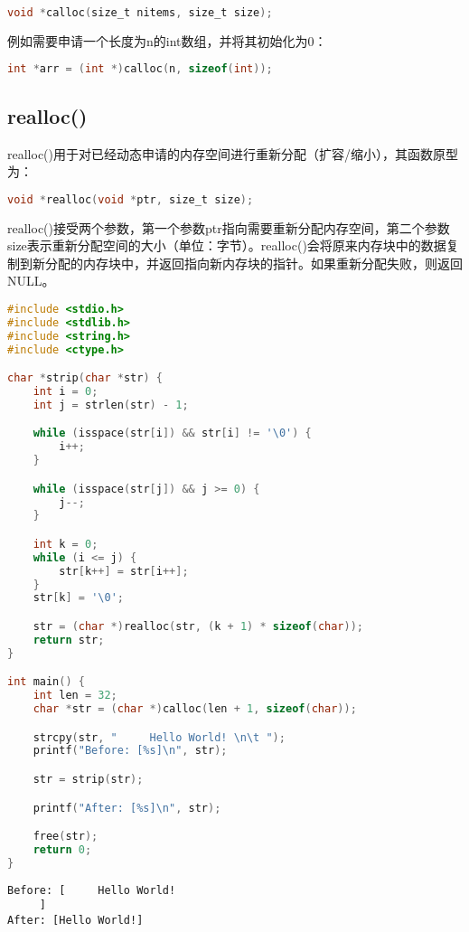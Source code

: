 \begin{lstlisting}[language=C]
void *calloc(size_t nitems, size_t size);
\end{lstlisting}

例如需要申请一个长度为n的int数组，并将其初始化为0：

\vspace{-0.5cm}

\begin{lstlisting}[language=C]
int *arr = (int *)calloc(n, sizeof(int));
\end{lstlisting}

\vspace{0.5cm}

\subsection{realloc()}

realloc()用于对已经动态申请的内存空间进行重新分配（扩容/缩小），其函数原型为：

\vspace{-0.5cm}

\begin{lstlisting}[language=C]
void *realloc(void *ptr, size_t size);
\end{lstlisting}

realloc()接受两个参数，第一个参数ptr指向需要重新分配内存空间，第二个参数size表示重新分配空间的大小（单位：字节）。realloc()会将原来内存块中的数据复制到新分配的内存块中，并返回指向新内存块的指针。如果重新分配失败，则返回NULL。\\


\begin{lstlisting}[language=C]
#include <stdio.h>
#include <stdlib.h>
#include <string.h>
#include <ctype.h>

char *strip(char *str) {
    int i = 0;
    int j = strlen(str) - 1;

    while (isspace(str[i]) && str[i] != '\0') {
        i++;
    }

    while (isspace(str[j]) && j >= 0) {
        j--;
    }

    int k = 0;
    while (i <= j) {
        str[k++] = str[i++];
    }
    str[k] = '\0';

    str = (char *)realloc(str, (k + 1) * sizeof(char));
    return str;
}

int main() {
    int len = 32;
    char *str = (char *)calloc(len + 1, sizeof(char));

    strcpy(str, "     Hello World! \n\t ");
    printf("Before: [%s]\n", str);

    str = strip(str);

    printf("After: [%s]\n", str);

    free(str);
    return 0;
}
\end{lstlisting}

\begin{tcolorbox}
    \begin{verbatim}
Before: [     Hello World! 
     ]
After: [Hello World!]
	\end{verbatim}
\end{tcolorbox}

\newpage
